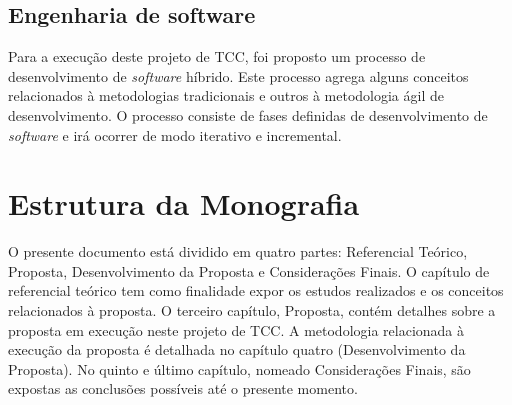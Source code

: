 \subsection{Engenharia de software}

Para a execução deste projeto de TCC, foi proposto um processo de desenvolvimento de \textit{software} híbrido. Este processo agrega alguns conceitos relacionados à metodologias tradicionais e outros à metodologia ágil de desenvolvimento. O processo consiste de fases definidas de desenvolvimento de \textit{software} e irá ocorrer de modo iterativo e incremental.

\section{Estrutura da Monografia}
O presente documento está dividido em quatro partes: Referencial Teórico, Proposta, Desenvolvimento da Proposta e Considerações Finais. O capítulo de referencial teórico tem como finalidade expor os estudos realizados e os conceitos relacionados à proposta. O terceiro capítulo, Proposta, contém detalhes sobre a proposta em execução neste projeto de TCC. A metodologia relacionada à execução da proposta é detalhada no capítulo quatro (Desenvolvimento da Proposta). No quinto e último capítulo, nomeado Considerações Finais, são expostas as conclusões possíveis até o presente momento.
